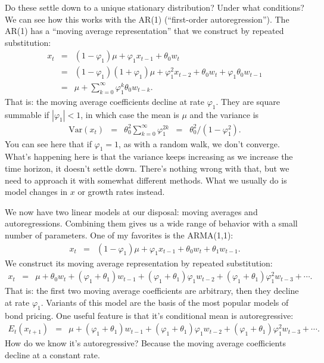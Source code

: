 \documentclass[11pt]{article}
\begin{document}
Do these settle down to a unique stationary distribution?  Under what conditions?
We can see how this works with the AR(1) (``first-order autoregression'').
The AR(1) has a ``moving average representation'' that we construct
by repeated substitution:
\begin{eqnarray*}
    x_t &=& (1-\varphi_1) \mu  + \varphi_1 x_{t-1} + \theta_0 w_t   \\
        &=& (1-\varphi_1)(1+\varphi_1) \mu  + \varphi_1^2 x_{t-2} + \theta_0 w_t + \varphi_1 \theta_0 w_{t-1} \\
        &=& \mu + \sum_{k=0}^\infty \varphi_1^k \theta_0 w_{t-k} .
\end{eqnarray*}
That is:  the moving average coefficients decline at rate $\varphi_1$.
They are square summable if $|\varphi_1| < 1$, in which case
the mean is $\mu$ and the variance is
\begin{eqnarray*}
    \mbox{Var} (x_t) &=& \theta_0^2 \sum_{k=0}^\infty \varphi_1^{2k}
            \;\;=\;\; \theta_0^2/(1-\varphi_1^2) .
\end{eqnarray*}
You can see here that if $\varphi_1 = 1$, as with a random walk,
we don't converge.
What's happening here is that the variance keeps increasing as we increase
the time horizon, it doesn't settle down.
There's nothing wrong with that, but we need to approach it with somewhat
different methods.
What we usually do is model changes in $x$ or growth rates instead.


We now have two linear models at our disposal:  moving averages and autoregressions.
Combining them gives us a wide range of behavior with a small number
of parameters.
One of my favorites is the ARMA(1,1):
\begin{eqnarray*}
    x_t &=& (1-\varphi_1) \mu  + \varphi_1 x_{t-1} + \theta_0 w_t + \theta_1 w_{t-1} .
\end{eqnarray*}
We construct its moving average representation by repeated substitution:
\begin{eqnarray*}
    x_t &=&  \mu  +  \theta_0 w_t + (\varphi_1+ \theta_1) w_{t-1}
                + (\varphi_1+ \theta_1)\varphi_1 w_{t-2}
                +  (\varphi_1+ \theta_1)\varphi_1^2 w_{t-3} + \cdots .
\end{eqnarray*}
That is:  the first two moving average coefficients are arbitrary,
then they decline at rate $\varphi_1$.
Variants of this model are the basis of the most popular models of bond pricing.
One useful feature is that it's conditional mean is autoregressive:
\begin{eqnarray*}
  E_t (  x_{t+1}) &=&  \mu  + (\varphi_1+ \theta_1) w_{t-1}
                + (\varphi_1+ \theta_1)\varphi_1 w_{t-2}
                +  (\varphi_1+ \theta_1)\varphi_1^2 w_{t-3} + \cdots .
\end{eqnarray*}
How do we know it's autoregressive?
Because the moving average coefficients decline at a constant rate.
\end{document}
